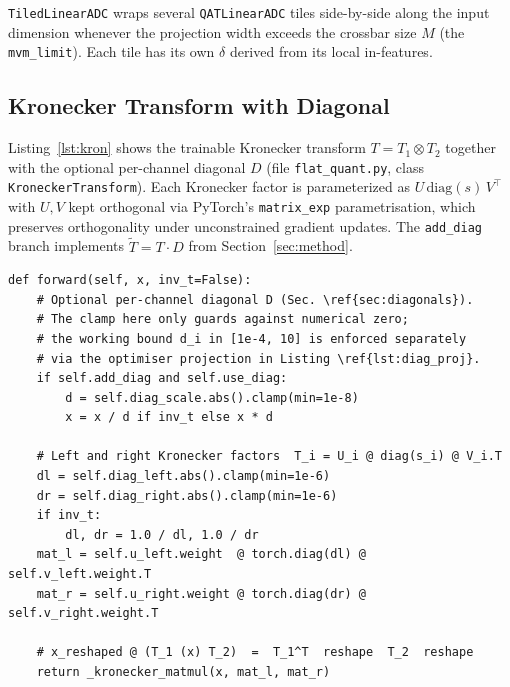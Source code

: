 \documentclass[a4paper,11pt,oneside]{article}
\theoremstyle{breakstyle}
\begin{document}
  \texttt{TiledLinearADC} wraps several \texttt{QATLinearADC} tiles
  side-by-side along the input dimension whenever the projection width
  exceeds the crossbar size $M$ (the \texttt{mvm\_limit}). Each tile
  has its own $\delta$ derived from its local in-features.

  \subsection{Kronecker Transform with Diagonal}
  \label{app:code:kron}

  Listing~\ref{lst:kron} shows the trainable Kronecker transform
  $T = T_1 \otimes T_2$ together with the optional per-channel
  diagonal $D$ (file \texttt{flat\_quant.py}, class
  \texttt{KroneckerTransform}). Each Kronecker factor is parameterized
  as $U \,\mathrm{diag}(s) \, V^\top$ with $U, V$ kept orthogonal via
  PyTorch's \texttt{matrix\_exp} parametrisation, which preserves
  orthogonality under unconstrained gradient updates. The
  \texttt{add\_diag} branch implements
  $\tilde{T} = T \cdot D$ from Section~\ref{sec:method}.

\begin{lstlisting}[label={lst:kron},caption={Kronecker transform forward with optional diagonal scaling (\texttt{KroneckerTransform.forward}). The \texttt{clamp(min=...)} calls in this listing only ensure positivity / numerical safety; the working bounds on the trainable diagonals are enforced as an optimiser projection after every step (see Listing~\ref{lst:diag_proj}).}]
def forward(self, x, inv_t=False):
    # Optional per-channel diagonal D (Sec. \ref{sec:diagonals}).
    # The clamp here only guards against numerical zero;
    # the working bound d_i in [1e-4, 10] is enforced separately
    # via the optimiser projection in Listing \ref{lst:diag_proj}.
    if self.add_diag and self.use_diag:
        d = self.diag_scale.abs().clamp(min=1e-8)
        x = x / d if inv_t else x * d

    # Left and right Kronecker factors  T_i = U_i @ diag(s_i) @ V_i.T
    dl = self.diag_left.abs().clamp(min=1e-6)
    dr = self.diag_right.abs().clamp(min=1e-6)
    if inv_t:
        dl, dr = 1.0 / dl, 1.0 / dr
    mat_l = self.u_left.weight  @ torch.diag(dl) @ self.v_left.weight.T
    mat_r = self.u_right.weight @ torch.diag(dr) @ self.v_right.weight.T

    # x_reshaped @ (T_1 (x) T_2)  =  T_1^T  reshape  T_2  reshape
    return _kronecker_matmul(x, mat_l, mat_r)
\end{lstlisting}
\end{document}
